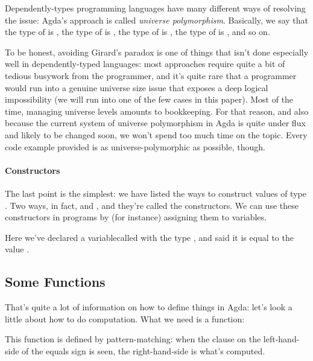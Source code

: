 Dependently-types programming languages have many different ways of resolving
the issue: Agda's approach is called \emph{universe polymorphism}.
Basically, we say that the type of  is
, the type of  is
, the type of 
is , the type of 
is , and so on.

To be honest, avoiding Girard's paradox is one of things that isn't done
especially well in dependently-typed languages: most approaches require quite a
bit of tedious busywork from the programmer, and it's quite rare that a
programmer would run into a genuine universe size issue that exposes a deep
logical impossibility (we will run into one of the few cases in this paper).
Most of the time, managing universe levels amounts to bookkeeping.
For that reason, and also because the current system of universe polymorphism in
Agda is quite under flux and likely to be changed soon, we won't spend too much
time on the topic.
Every code example provided is as universe-polymorphic as possible, though.

\paragraph{Constructors}
The last point is the simplest: we have listed the ways to construct values of
type .
Two ways, in fact,  and
, and they're called the constructors.
We can use these constructors in programs by (for instance) assigning them to
variables.
\begin{multicols}{2}\centering
  \columnbreak
\end{multicols}\vspace{-2\baselineskip}\noindent
Here we've declared a variable\footnotemark\;called  with
the type , and said it is equal to the value
.


\subsection{Some Functions}
That's quite a lot of information on how to define things in Agda: let's look a
little about how to do computation.
What we need is a function:
\begin{multicols}{2}\centering
  \columnbreak
\end{multicols}\vspace{-2\baselineskip}\noindent
This function is defined by pattern-matching: when the clause on the
left-hand-side of the equals sign is seen, the right-hand-side is what's
computed.

